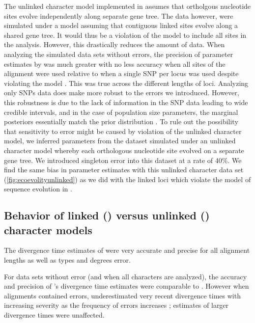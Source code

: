 The unlinked character model implemented in \ecoevolity assumes that ortholgous 
nucleotide sites evolve independently along separate gene tree. The data however, were
simulated under a model assuming that contiguous linked sites evolve along a shared 
gene tree. It would thus be a violation of the \ecoevolity model to include all
sites in the analysis. However, this drastically reduces the amount of data.    
When analyzing the simulated data sets without errors, the precision of
parameter estimates by \ecoevolity was much greater with no less accuracy 
when all sites of the alignment were used relative to when a single SNP per 
locus was used despite violating the model \mainfigsp. This was true across the 
different lengths of loci.
Analyzing only SNPs data does make \ecoevolity more robust to the errors
we introduced.
However, this robustness is due to the lack of information in the
SNP data leading to wide credible intervals, and in the case of
population size parameters, the marginal posteriors essentially
match the prior distribution \thetafigsp.
To rule out the possibility that sensitivity to error might be caused by
violation of the unlinked character model, we inferred parameters from the 
dataset simulated under an unlinked character model whereby each orthologous
nucleotide site evolved on a separate gene tree. We introduced singleton error 
into this dataset at a rate of 40\%. We find the same bias in parameter estimates
with this unlinked character data set (\cref{fig:ecoevolityunlinked}) as we did 
with the linked loci which violate the model of sequence evolution in 
\ecoevolity \timefigsp.



\subsection{Behavior of linked (\beast) versus unlinked (\ecoevolity) character
    models}
    
The divergence time estimates of \beast were very accurate and precise for all
alignment lengths as well as types and degrees error. 

For data sets without error (and when all characters are analyzed), the
accuracy and precision of \ecoevolity's divergence time estimates were
comparable to \beast \timefigsp.
However when alignments contained errors, \ecoevolity underestimated very
recent divergence times with increasing severity as the frequency of errors
increases \timefigsp; estimates of larger divergence times were unaffected.

